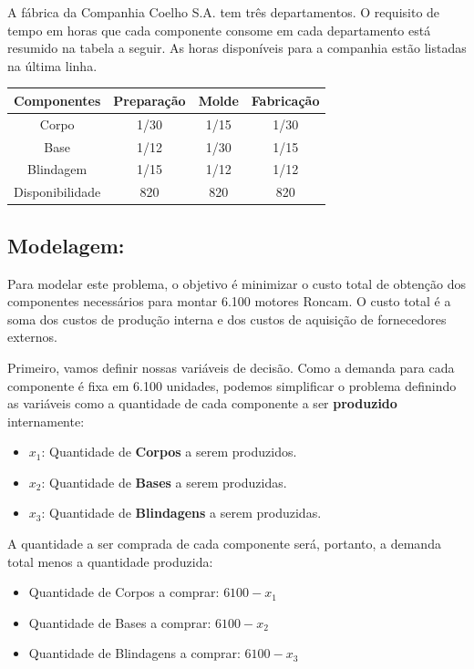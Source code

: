 \documentclass[12pt, a4paper]{article}
\begin{document}
A fábrica da Companhia Coelho S.A. tem três departamentos. O requisito de tempo em horas que cada componente consome em cada departamento está resumido na tabela a seguir. As horas disponíveis para a companhia estão listadas na última linha.

\begin{table}[htb]
  \centering
  \begin{tabular}{cccc}
    \toprule
    Componentes & Preparação & Molde & Fabricação\\
    \midrule
    Corpo & 1/30 & 1/15 & 1/30 \\
    Base & 1/12 & 1/30 & 1/15 \\
    Blindagem & 1/15 & 1/12 & 1/12 \\
    Disponibilidade & 820 & 820 & 820 \\
    \bottomrule
  \end{tabular}
\end{table}

\subsection[Modelagem]{Modelagem:}
Para modelar este problema, o objetivo é minimizar o custo total de obtenção dos componentes necessários para montar 6.100 motores Roncam. O custo total é a soma dos custos de produção interna e dos custos de aquisição de fornecedores externos.

Primeiro, vamos definir nossas variáveis de decisão. Como a demanda para cada componente é fixa em 6.100 unidades, podemos simplificar o problema definindo as variáveis como a quantidade de cada componente a ser \textbf{produzido} internamente:

\begin{itemize}
    \item $x_1$: Quantidade de \textbf{Corpos} a serem produzidos.
    \item $x_2$: Quantidade de \textbf{Bases} a serem produzidas.
    \item $x_3$: Quantidade de \textbf{Blindagens} a serem produzidas.
\end{itemize}

A quantidade a ser comprada de cada componente será, portanto, a demanda total menos a quantidade produzida:
\begin{itemize}
    \item Quantidade de Corpos a comprar: $6100 - x_1$
    \item Quantidade de Bases a comprar: $6100 - x_2$
    \item Quantidade de Blindagens a comprar: $6100 - x_3$
\end{itemize}
\end{document}
